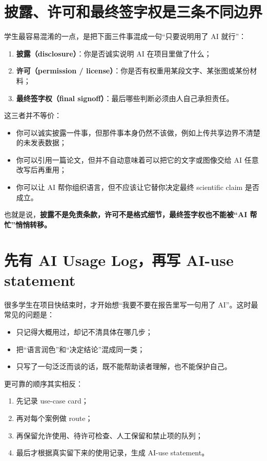 \section{披露、许可和最终签字权是三条不同边界}

学生最容易混淆的一点，是把下面三件事混成一句“只要说明用了 AI 就行”：

\begin{enumerate}
    \item \textbf{披露（disclosure）}：你是否诚实说明 AI 在项目里做了什么；
    \item \textbf{许可（permission / license）}：你是否有权重用某段文字、某张图或某份材料；
    \item \textbf{最终签字权（final signoff）}：最后哪些判断必须由人自己承担责任。
\end{enumerate}

这三者并不等价：

\begin{itemize}
    \item 你可以诚实披露一件事，但那件事本身仍然不该做，例如上传共享边界不清楚的未发表数据；
    \item 你可以引用一篇论文，但并不自动意味着可以把它的文字或图像交给 AI 任意改写后再重用；
    \item 你可以让 AI 帮你组织语言，但不应该让它替你决定最终 scientific claim 是否成立。
\end{itemize}

也就是说，\textbf{披露不是免责条款，许可不是格式细节，最终签字权也不能被“AI 帮忙”悄悄转移。}

\section{先有 AI Usage Log，再写 AI-use statement}

很多学生在项目快结束时，才开始想“我要不要在报告里写一句用了 AI”。这时最常见的问题是：

\begin{itemize}
    \item 只记得大概用过，却记不清具体在哪几步；
    \item 把“语言润色”和“决定结论”混成同一类；
    \item 只写了一句泛泛而谈的话，既不能帮助读者理解，也不能保护自己。
\end{itemize}

更可靠的顺序其实相反：

\begin{enumerate}
    \item 先记录 use-case card；
    \item 再对每个案例做 route；
    \item 再保留允许使用、待许可检查、人工保留和禁止项的队列；
    \item 最后才根据真实留下来的使用记录，生成 AI-use statement。
\end{enumerate}

